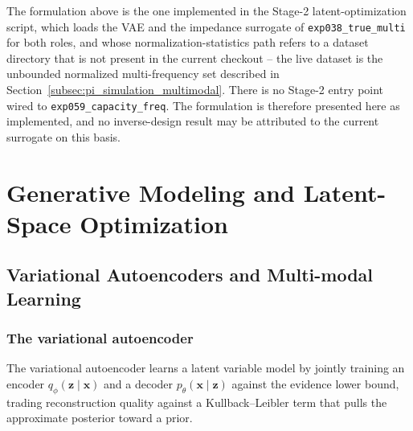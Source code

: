 The formulation above is the one implemented in the Stage-2 latent-optimization
script, which loads the VAE and the impedance surrogate of
\texttt{exp038\_true\_multi} for both roles, and whose normalization-statistics
path refers to a dataset directory that is not present in the current checkout
-- the live dataset is the unbounded normalized multi-frequency set described in
Section~\ref{subsec:pi_simulation_multimodal}. There is no Stage-2 entry point
wired to \texttt{exp059\_capacity\_freq}. The formulation is therefore presented
here as implemented, and no inverse-design result may be attributed to the
current surrogate on this basis.

\section{Generative Modeling and Latent-Space Optimization}
\label{sec:generative_latent_opt}

\subsection{Variational Autoencoders and Multi-modal Learning}
\label{subsec:vae_multimodal}

\subsubsection*{The variational autoencoder}

The variational autoencoder \cite{kingma2013auto} learns a latent variable model
by jointly training an encoder $q_\phi(\mathbf{z}\mid\mathbf{x})$ and a decoder
$p_\theta(\mathbf{x}\mid\mathbf{z})$ against the evidence lower bound, trading
reconstruction quality against a Kullback--Leibler term that pulls the
approximate posterior toward a prior.

